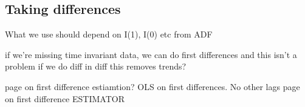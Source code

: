 
\subsection{Taking differences}

What we use should depend on I(1), I(0) etc from ADF

if we're missing time invariant data, we can do first differences and this isn't a problem
if we do diff in diff this removes trends?

page on first difference estiamtion? OLS on first differences. No other lags
page on first difference ESTIMATOR

